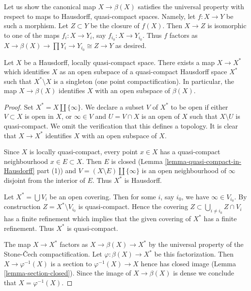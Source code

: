 \medskip\noindent
Let us show the canonical map $X \to \beta(X)$ satisfies the universal
property with respect to maps to Hausdorff, quasi-compact spaces. Namely,
let $f : X \to Y$ be such a morphism. Let $Z \subset Y$ be the closure
of $f(X)$. Then $X \to Z$ is isomorphic to one of the maps
$f_i : X \to Y_i$, say $f_{i_0} : X \to Y_{i_0}$. Thus $f$ factors as
$X \to \beta(X) \to \prod Y_i \to Y_{i_0} \cong Z \to Y$ as desired.

\begin{lemma}
\label{lemma-one-point-compactification}
Let $X$ be a Hausdorff, locally quasi-compact space.
There exists a map $X \to X^*$ which identifies $X$ as an open
subspace of a quasi-compact Hausdorff space $X^*$ such that
$X^* \setminus X$ is a singleton (one point compactification).
In particular, the map $X \to \beta(X)$ identifies $X$
with an open subspace of $\beta(X)$.
\end{lemma}

\begin{proof}
Set $X^* = X \amalg \{\infty\}$. We declare a subset $V$ of $X^*$ to be
open if either $V \subset X$ is open in $X$, or $\infty \in V$ and
$U = V \cap X$ is an open of $X$ such that $X \setminus U$ is quasi-compact.
We omit the verification that this defines a topology. It is clear
that $X \to X^*$ identifies $X$ with an open subspace of $X$.

\medskip\noindent
Since $X$ is locally quasi-compact, every point $x \in X$ has a
quasi-compact neighbourhood $x \in E \subset X$. Then $E$
is closed (Lemma \ref{lemma-quasi-compact-in-Hausdorff} part (1)) and
$V = (X \setminus E) \amalg \{\infty\}$ is an open neighbourhood
of $\infty$ disjoint from the interior of $E$. Thus $X^*$ is Hausdorff.

\medskip\noindent
Let $X^* = \bigcup V_i$ be an open covering. Then for some $i$, say $i_0$,
we have $\infty \in V_{i_0}$. By construction $Z = X^* \setminus V_{i_0}$
is quasi-compact. Hence the covering
$Z \subset \bigcup_{i \not = i_0} Z \cap V_i$ has a finite refinement which
implies that the given covering of $X^*$ has a finite refinement.
Thus $X^*$ is quasi-compact.

\medskip\noindent
The map $X \to X^*$ factors as $X \to \beta(X) \to X^*$ by the universal
property of the Stone-{\v C}ech compactification. Let
$\varphi : \beta(X) \to X^*$ be this factorization.
Then $X \to \varphi^{-1}(X)$ is a section to
$\varphi^{-1}(X) \to X$ hence has closed image
(Lemma \ref{lemma-section-closed}).
Since the image of $X \to \beta(X)$ is dense we conclude that
$X = \varphi^{-1}(X)$.
\end{proof}










